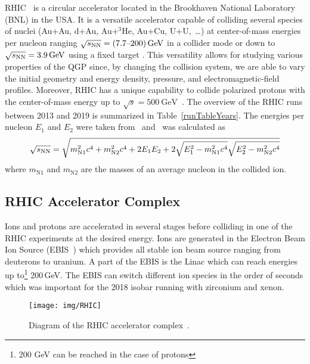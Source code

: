 RHIC~\cite{RHICproject, RHICdesign} is a circular accelerator located in the Brookhaven National Laboratory 
(BNL) in the USA\@. It is a versatile accelerator capable of
colliding several species of nuclei (Au+Au, d+Au, Au+$^3$He, Au+Cu, U+U,~\dots) at
center-of-mass energies per nucleon
ranging $\sqrt{s_\text{NN}} = (\text{7.7--200})\,\si{\giga\electronvolt}$ in a collider mode or down to
$\sqrt{s_\text{NN}} = 3.9\,\si{\giga\electronvolt}$
using a fixed target \cite{fixedTarget}\@. This versatility allows for studying various properties of the QGP since, by changing the collision system, we are able to vary the initial geometry and energy density, pressure, and electromagnetic-field profiles. Moreover, RHIC has a unique capability to collide polarized protons with
the center-of-mass energy up to $\sqrt{s} = \SI{500}{\giga\electronvolt}$~\cite{polarizedProtons}\@. The overview
of the RHIC runs between 2013 and 2019 is summarized in Table~\ref{runTableYears}\@. The energies per nucleon $E_1$ and $E_2$ were taken from~\cite{RHICrunsTable} and \snn\ was calculated as
\begin{equation}
 \sqrt{s_\text{NN}} = \sqrt{m_\mathrm{N1}^2c^4 + m_\mathrm{N2}^2c^4 + 2E_1E_2 + 2\sqrt{E_1^2-m_\mathrm{N1}^2c^4}\sqrt{E_2^2-m_\mathrm{N2}^2c^4}}
\end{equation}
where $m_\mathrm{N1}$ and $m_\mathrm{N2}$ are the masses of an average nucleon in the collided ion.


 

\subsection{RHIC Accelerator Complex}
Ions and protons are accelerated in several stages before colliding in one of the RHIC experiments at the desired energy. Ions are generated in the Electron Beam Ion Source (EBIS~\cite{EBIS}) which provides all stable ion beam source ranging from deuterons to uranium. A part of the EBIS is the Linac which can reach energies up to\footnote{200 GeV can be reached in the case of protons} 200$\,$GeV\@. The EBIS can switch different ion species in the order of seconds which was important for the 2018 isobar running with zirconium and xenon.

\begin{figure}[htb]
\begin{center}
 \texttt{[image: img/RHIC]}\\
\end{center}
\caption{\label{RHICcomplex}Diagram of the RHIC accelerator complex~\cite{RHICpages}.}
\end{figure}

